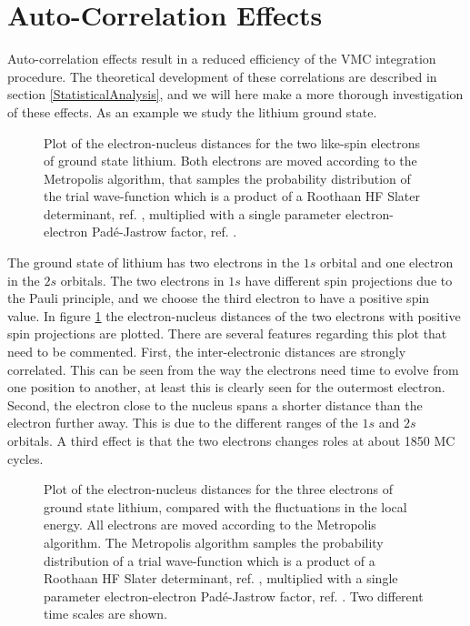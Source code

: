 %
%
\section{Auto-Correlation Effects}

Auto-correlation effects result in a reduced efficiency of the VMC
integration procedure. The theoretical development of these correlations
are described in section \ref{StatisticalAnalysis}, and we will here
make a more thorough investigation of these effects. As an example we
study the lithium ground state.
\newline

\begin{figure}[hbtp]
  
  \caption{Plot of the electron-nucleus distances for the two
  like-spin electrons of ground state lithium. Both electrons are
  moved according to 
  the Metropolis algorithm, that samples the probability distribution
  of the trial wave-function which is a product of a Roothaan HF Slater
  determinant, ref. \cite{clementi1974}, multiplied with a single
  parameter electron-electron Pad\'{e}-Jastrow factor, 
  ref. \cite{hammond1994}.
  }
  \label{twoElectronPlot}
\end{figure}


The ground state of lithium has two electrons in the $1s$ orbital and
one electron in the $2s$ orbitals. The two electrons in $1s$ have
different spin projections due to the Pauli principle, and we choose the
third electron to have a positive spin value. In figure
\ref{twoElectronPlot} the electron-nucleus distances of the two
electrons with positive spin projections 
are plotted. There are several features regarding this plot that need
to be commented. First, the inter-electronic distances are strongly
correlated. This can be seen from the way the electrons need time to
evolve from one position to another, at least this is clearly seen for
the outermost electron. Second, the electron close to the
nucleus spans a shorter distance than the electron further
away. This is due to the different ranges of the $1s$ and $2s$
orbitals. A third effect is that the two electrons changes roles at
about 1850 MC cycles. 
\newline

\begin{figure}[hbp]
   
   
  \caption{Plot of the electron-nucleus distances for the three
  electrons of ground state lithium, compared with the fluctuations in
  the local energy. All electrons are moved according to the
  Metropolis algorithm. The Metropolis algorithm 
  samples the probability distribution of a trial wave-function which
  is a product of a Roothaan HF Slater determinant,
  ref. \cite{clementi1974}, multiplied with a single parameter
  electron-electron Pad\'{e}-Jastrow factor, ref. \cite{hammond1994}.
  Two different time scales are shown.
  }
  \label{electronDistanceLocalEnergy}
\end{figure}

